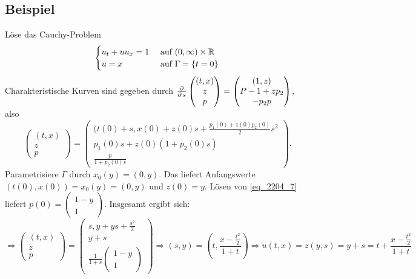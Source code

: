 \subsection{Beispiel}
\label{bsp_9}
	Löse das Cauchy-Problem \marginnote{[9]}
	\[ \begin{cases}
		u_t + uu_x = 1 & \text{ auf } (0,\infty) \times \mathbb{R} \\
		u = x & \text{ auf } \Gamma = \{t = 0\} \end{cases} \]
	Charakteristische Kurven sind gegeben durch $\frac{\operatorname{\partial}}{\operatorname{\partial} s} \begin{pmatrix} (t,x) \\ z \\ 	p \end{pmatrix} = \begin{pmatrix} (1,z) \\ P-1+zp_2 \\ -p_2 p \end{pmatrix}$, also
	\[ \begin{pmatrix} (t,x) \\ z \\ 	p \end{pmatrix} = \begin{pmatrix} (t(0)+s,x(0) + z(0)s + \frac{p_1(0)+z(0)p_2(0)}{2} s^2 \\ p_1(0)s + z(0)(1+p_2(0)s) \\ \frac{p}{1+p_2(0)s} \end{pmatrix}.\]
	Parametrisiere $\Gamma$ durch $x_0(y) = (0,y)$. Das liefert Anfangswerte $(t(0),x(0))=x_0(y)=(0,y)$ und $z(0) = y$. Lösen von \eqref{eq_2204_7} liefert $p(0) = \begin{pmatrix} 1-y \\ 1 \end{pmatrix}$. Insgesamt ergibt sich:
	\[ \Rightarrow \begin{pmatrix} (t,x) \\ z \\ p \end{pmatrix} = \begin{pmatrix} s,y+ys+\frac{s^2}{2} \\ y+s \\ \frac{1}{1+s} \begin{pmatrix} 1-y \\ 1 \end{pmatrix} \end{pmatrix} \Rightarrow (s,y) = \left( t,\frac{x-\frac{t^2}{2}}{1+t}\right) \Rightarrow u(t,x) = z(y,s) = y+s = t + \frac{x-\frac{t^2}{2}}{1+t} \]
	
